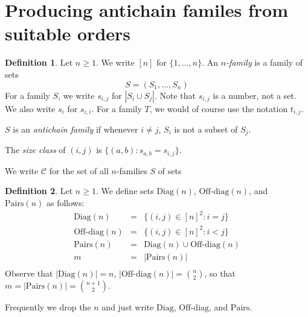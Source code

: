 \documentclass[12pt]{article}
\theoremstyle{definition}
\newtheorem{definition}{Definition}
\newcommand{\set}[1]{\{ #1 \}}
\newcommand{\rem}[1]{\relax}
\newcommand{\Diag}{\mbox{Diag}}
\newcommand{\OffDiag}{\mbox{Off-diag}}
\newcommand{\Pairs}{\mbox{Pairs}}
\newcommand{\ordercanonical}{<_{\scriptstyle can}}
\begin{document}
\section{Producing antichain familes from suitable orders}

\begin{definition}
Let $n\geq 1$.   We write $[n]$ for $\set{1,\ldots, n}$.
An \emph{$n$-family} is  a family of sets
\[ S = (S_1, \ldots, S_n)\]
\rem{
A \emph{suitable $n$-family}
is
such that for all $i \neq j$ in $\set{1,\ldots, n}$,
the set-theoretic difference
$S_i\setminus S_j$ is non-empty (and hence so is $S_j\setminus S_i$).
}
For a family $S$, we write $s_{i,j}$
for $|S_i\cup S_j|$.  Note that $s_{i,j}$
is a number, not a set.
We also write $s_i$ for $s_{i,i}$.
For a family $T$, we would of course use the notation $t_{i,j}$.

$S$ is an \emph{antichain family} if whenever $i \neq j$,
$S_i$ is not a subset of $S_j$.

The \emph{size class} of $(i,j)$ is $\set{(a,b): s_{a,b}= s_{i,j}}$.

 We write $\mathcal{C}$ for the
set of all $n$-families $S$ of sets
\end{definition}



\begin{definition}
Let $n\geq 1$.
We define  sets $\Diag(n)$, $\OffDiag(n)$, and $\Pairs(n)$ as follows:
\[
\begin{array}{lcl}
\Diag(n) & = & \set{(i,j)\in [n]^2:  i = j}\\
\OffDiag(n) & = & \set{(i,j)\in [n]^2:  i < j}\\
\Pairs(n) & = & \Diag(n)\cup\OffDiag(n)\\
m  & = & |\Pairs(n)|\\
\end{array}
\]
Observe that $|\Diag(n)| = n$,
$|\OffDiag(n)| = \binom{n}{2}$,
so that $m =  |\Pairs(n)| = \binom{n+1}{2}$.

Frequently we drop the $n$ and just write
$\Diag$, $\OffDiag$, and $\Pairs$.
\end{definition}

\rem{
\begin{definition} Let $<$ be a   suitable linear preorder of $\Pairs(n)$.
We fix a well-order $\ordercanonical$ on $\Pairs(n)$
to be any well-order on $\Pairs(n)$ with the property that if $(a,b) < (c,d)$ then $(a,b) \ordercanonical (c,d)$.
\end{definition}
}
\end{document}
